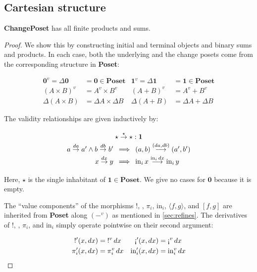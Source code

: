 \documentclass{rntz}
\newcommand\cat\textbf
\newcommand\CP{\cat{ChangePoset}}
\newcommand\Poset{\cat{Poset}}
\newcommand\initO{\ensuremath{\mathbold{0}}}
\newcommand\termO{\ensuremath{\mathbold{1}}}
\newcommand\D\Delta
\newcommand\x\times
\newcommand\tuple[1]{\left({#1}\right)}
\newcommand\triv{\star}
\newcommand\injc{\mathrm{in}}
\newcommand\inj[1]{\injc_{#1}\,}
\newcommand\validarrow{{\to}}
\newcommand\longvalidarrow{{\longrightarrow}}
\newcommand\valid[1]{\mathrel{\overset{#1}{\validarrow}}}
\newcommand\longvalid[1]{\mathrel{\overset{#1}{\longvalidarrow}}}
\newcommand\vals[1]{#1^v} %
\newcommand\chgs[1]{\D{#1}}
\newcommand\fork[1]{\langle{#1}\rangle}
\newcommand\funct[1]{\vals{#1}}
\newcommand\deriv[1]{#1'}
\begin{document}

\subsection{Cartesian structure}

\begin{theorem}
  \CP{} has all finite products and sums.
\end{theorem}

\begin{proof}
  We show this by constructing initial and terminal objects and binary sums and
  products. In each case, both the underlying and the change posets come from
  the corresponding structure in \Poset{}:

  \begin{align*}
    \vals \initO = \chgs \initO &= \initO \in \Poset &
    \vals \termO = \chgs \termO &= \termO \in \Poset \\
    \vals{(A \x B)} &= \vals A \x \vals B &
    \vals{(A + B)} &= \vals A + \vals B \\
    \chgs{(A \x B)} &= \chgs A \x \chgs B &
    \chgs{(A + B)} &= \chgs A + \chgs B
  \end{align*}

  \noindent The validity relationships are given inductively by:

  \[\setlength\arraycolsep{.25em}\def\arraystretch{1.45}
  \begin{array}{rcl}
    \multicolumn{3}{c}{\triv \valid{\triv} \triv : \termO} \\
    a \valid{da} a' \wedge b \valid{db} b'
    &\implies& \tuple{a,b} \longvalid{\tuple{da,db}} \tuple{a',b'} \\
    x \valid{dx} y &\implies&
    \inj{i} x \longvalid{\inj{i} dx} \inj{i} y
  \end{array}\]

  \noindent Here, $\triv$ is the single inhabitant of $\termO \in \Poset$. We
  give no cases for $\initO$ because it is empty.

  The ``value components'' of the morphisms $!$, \textexclamdown, $\pi_i$,
  $\injc_i$, $\fork{f, g}$, and $[f,g]$ are inherited from \Poset{} along
  $(\vals{-})$ as mentioned in \cref{sec:refines}. The derivatives of $!$,
  \textexclamdown, $\pi_i$, and $\injc_i$ simply operate pointwise on their
  second argument:

  \begin{align*}
    {\deriv{!}}(x,dx) &= {\funct{!}}\,dx &
    \deriv{\text{\textexclamdown}}(x,dx) &= \funct{\text{\textexclamdown}}\,dx\\
    \deriv\pi_i(x,dx) &= \funct{\pi_i}\,dx &
    \deriv\injc_i(x,dx) &= \funct{\injc_i}\,dx
  \end{align*}


\end{proof}
\end{document}
